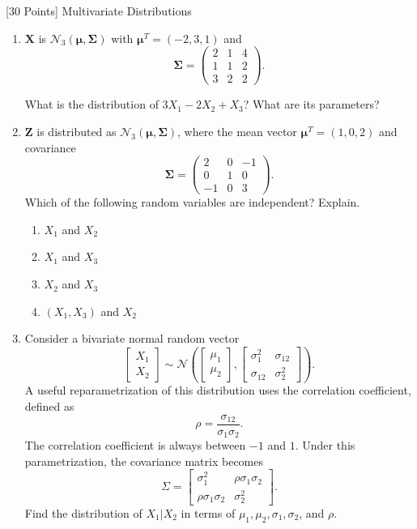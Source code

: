 [30 Points] Multivariate Distributions \\

\begin{enumerate}
    \item 

\( \mathbf{X} \) is \( \mathcal{N}_3(\boldsymbol{\mu}, \boldsymbol{\Sigma}) \) with \( \boldsymbol{\mu}^T = (-2, 3, 1) \) and
\[
\boldsymbol{\Sigma} = 
\begin{pmatrix}
2 & 1 & 4 \\
1 & 1 & 2 \\
3 & 2 & 2
\end{pmatrix}.
\]

What is the distribution of \( 3X_1 - 2X_2 + X_3 \)? What are its parameters?

    \item 

\( \mathbf{Z} \) is distributed as \( \mathcal{N}_3(\boldsymbol{\mu}, \boldsymbol{\Sigma}) \), where the mean vector \( \boldsymbol{\mu}^T = (1, 0, 2) \) and covariance
\[
\boldsymbol{\Sigma} = 
\begin{pmatrix}
2 & 0 & -1 \\
0 & 1 & 0 \\
-1 & 0 & 3
\end{pmatrix}.
\]
Which of the following random variables are independent? Explain.

\begin{enumerate}
    \item \( X_1 \) and \( X_2 \)
    \item \( X_1 \) and \( X_3 \)
    \item \( X_2 \) and \( X_3 \)
    \item \( (X_1, X_3) \) and \( X_2 \)
\end{enumerate}

    
    \item 

Consider a bivariate normal random vector
\[
\begin{bmatrix}
X_1 \\
X_2
\end{bmatrix}
\sim \mathcal{N}\left(
\begin{bmatrix}
\mu_1 \\
\mu_2
\end{bmatrix},
\begin{bmatrix}
\sigma_1^2 & \sigma_{12} \\
\sigma_{12} & \sigma_2^2
\end{bmatrix}
\right).
\]
A useful reparametrization of this distribution uses the correlation coefficient, defined as
\[
\rho = \frac{\sigma_{12}}{\sigma_1\sigma_2}.
\]
The correlation coefficient is always between $-1$ and $1$. Under this parametrization, the covariance matrix becomes
\[
\Sigma =
\begin{bmatrix}
\sigma_1^2 & \rho\sigma_1\sigma_2 \\
\rho\sigma_1\sigma_2 & \sigma_2^2
\end{bmatrix}.
\]
Find the distribution of $X_1 | X_2$ in terms of \(\mu_1, \mu_2, \sigma_1, \sigma_2\), and \(\rho\).


\end{enumerate}